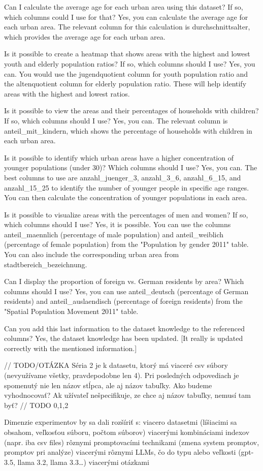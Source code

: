 Can I calculate the average age for each urban area using this dataset? If so, which columns could I use for that?
Yes, you can calculate the average age for each urban area. The relevant column for this calculation is durchschnittsalter, which provides the average age for each urban area.

Is it possible to create a heatmap that shows areas with the highest and lowest youth and elderly population ratios? If so, which columns should I use?
Yes, you can. You would use the jugendquotient column for youth population ratio and the altenquotient column for elderly population ratio. These will help identify areas with the highest and lowest ratios.

Is it possible to view the areas and their percentages of households with children? If so, which columns should I use?
Yes, you can. The relevant column is anteil_mit_kindern, which shows the percentage of households with children in each urban area.

Is it possible to identify which urban areas have a higher concentration of younger populations (under 30)? Which columns should I use?
Yes, you can. The best columns to use are anzahl_juenger_3, anzahl_3_6, anzahl_6_15, and anzahl_15_25 to identify the number of younger people in specific age ranges. You can then calculate the concentration of younger populations in each area.

Is it possible to visualize areas with the percentages of men and women? If so, which columns should I use?
Yes, it is possible. You can use the columns anteil_maennlich (percentage of male population) and anteil_weiblich (percentage of female population) from the "Population by gender 2011" table. You can also include the corresponding urban area from stadtbereich_bezeichnung.

Can I display the proportion of foreign vs. German residents by area? Which columns should I use?
Yes, you can use anteil_deutsch (percentage of German residents) and anteil_auslaendisch (percentage of foreign residents) from the "Spatial Population Movement 2011" table.

Can you add this last information to the dataset knowledge to the referenced columns?
Yes, the dataset knowledge has been updated. [It really is updated correctly with the mentioned information.]

// TODO/OTÁZKA Séria 2 je k datasetu, ktorý má viaceré csv súbory (nevyužívame všetky, pravdepodobne len 4). Pri posledných odpovediach je spomenutý nie len názov stĺpca, ale aj názov tabuľky. Ako budeme vyhodnocovať? Ak užívateľ nešpecifikuje, ze chce aj názov tabuľky, nemusí tam byť?
// TODO 0,1,2

Dimenzie experimentov by sa dali rozšíriť s:
viacero datasetmi (líšiacimi sa obsahom, veľkosťou súboru, počtom súborov)
viacerými kombináciami indexov (napr. iba csv files)
rôznymi promptovacími technikami (zmena system promptov, promptov pri analýze)
viacerými rôznymi LLMs, čo do typu alebo veľkosti (gpt-3.5, llama 3.2, llama 3.3…)
viacerými otázkami
